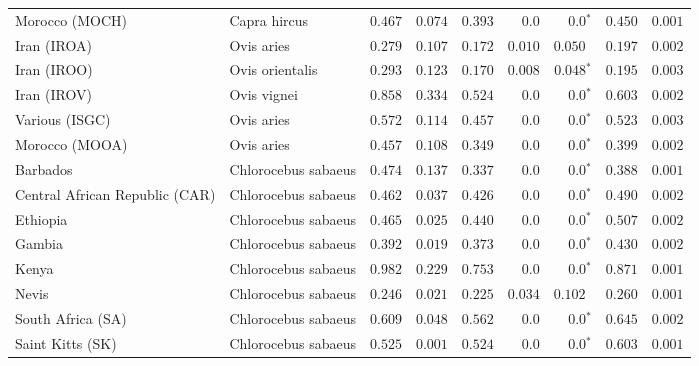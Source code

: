 \begin{center}
\begin{adjustbox}{width = 1\textwidth}
\begin{tabular}{|l|l|r|r|r|r|r|r|r|}
            Morocco (MOCH)                    & Capra hircus     & $ 0.467$ & $ 0.074$ & $ 0.393$ & $0.0$ & $\bm{0.0{^*}}$ & $ 0.450$ & $ 0.001$ \\
            Iran (IROA)                    & Ovis aries         & $ 0.279$ & $ 0.107$ & $ 0.172$ & $ 0.010$    & $ 0.050~~$    & $ 0.197$ & $ 0.002$ \\
            Iran (IROO)                 & Ovis orientalis          & $ 0.293$ & $ 0.123$ & $ 0.170$ & $ 0.008$    & $\bm{ 0.048{^*}}$    & $ 0.195$ & $ 0.003$ \\
            Iran (IROV)                 & Ovis vignei          & $ 0.858$ & $ 0.334$ & $ 0.524$ & $0.0$    & $\bm{0.0{^*}}$    & $ 0.603$ & $ 0.002$ \\
            Various (ISGC)                       & Ovis aries & $ 0.572$ & $ 0.114$ & $ 0.457$ & $0.0$    & $\bm{0.0{^*}}$    & $ 0.523$ & $ 0.003$ \\
            Morocco (MOOA) & Ovis aries & $ 0.457$ & $ 0.108$ & $ 0.349$ & $0.0$ & $\bm{0.0{^*}}$ & $ 0.399$ & $ 0.002$ \\
            Barbados                       & Chlorocebus sabaeus & $ 0.474$ & $ 0.137$ & $ 0.337$ & $0.0$    & $\bm{0.0{^*}}$    & $ 0.388$ & $ 0.001$ \\
            Central African Republic (CAR)                         & Chlorocebus sabaeus & $ 0.462$ & $ 0.037$ & $ 0.426$ & $0.0$    & $\bm{0.0{^*}}$    & $ 0.490$ & $ 0.002$ \\
            Ethiopia                          & Chlorocebus sabaeus & $ 0.465$ & $ 0.025$ & $ 0.440$ & $0.0$    & $\bm{0.0{^*}}$    & $ 0.507$ & $ 0.002$ \\
            Gambia                          & Chlorocebus sabaeus & $ 0.392$ & $ 0.019$ & $ 0.373$ & $0.0$ & $\bm{0.0{^*}}$        & $ 0.430$ & $ 0.002$ \\
            Kenya              & Chlorocebus sabaeus & $ 0.982$ & $ 0.229$ & $ 0.753$ & $0.0$    & $\bm{0.0{^*}}$ & $ 0.871$ & $ 0.001$ \\
            Nevis               & Chlorocebus sabaeus & $ 0.246$ & $ 0.021$ & $ 0.225$ & $ 0.034$    & $ 0.102~~$ & $ 0.260$ & $ 0.001$ \\
            South Africa (SA)                         & Chlorocebus sabaeus & $ 0.609$ & $ 0.048$ & $ 0.562$ & $0.0$    & $\bm{0.0{^*}}$    & $ 0.645$ & $ 0.002$ \\
            Saint Kitts (SK)                  & Chlorocebus sabaeus        & $ 0.525$ & $ 0.001$ & $ 0.524$ & $0.0$    & $\bm{0.0{^*}}$    & $ 0.603$ & $ 0.001$ \\

\end{tabular}
\end{adjustbox}
\end{center}
